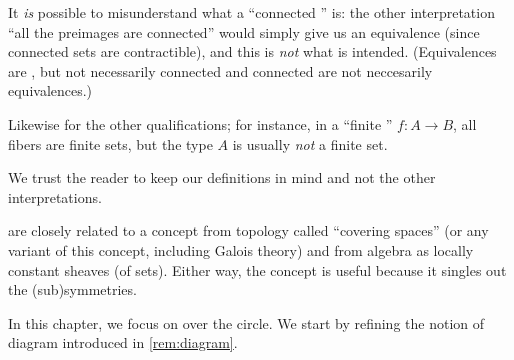\begin{remark}
  It \emph{is} possible to misunderstand what a ``connected \covering'' is:
the other interpretation ``all the preimages are connected''
would simply give us an equivalence (since connected sets are contractible),
and this is \emph{not} what is intended. (Equivalences are \coverings,
but not necessarily connected \coverings and connected \coverings are not neccesarily equivalences.)

Likewise for the other qualifications; for instance, in a ``finite \covering'' $f:A\to B$,
all fibers are finite sets, but 
the type $A$ is usually \emph{not} a finite set.

We trust the reader to keep our definitions in mind and not the other interpretations.
\end{remark}


\begin{remark}
  \Coverings are closely related to a concept from topology called ``covering spaces''
(or any variant of this concept, including Galois theory) and from algebra as locally constant sheaves (of sets).
Either way, the concept is useful because it singles out the (sub)symmetries.
\end{remark}

In this chapter, we focus on \coverings over the circle.
We start by refining the notion of diagram introduced in
\cref{rem:diagram}.

